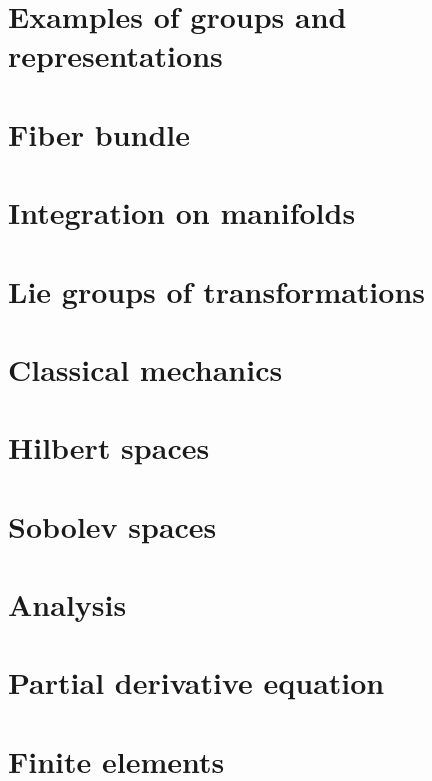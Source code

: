 \documentclass[a4paper,twoside,11pt]{book}
\begin{document}
\chapter{Examples of groups and representations}        \label{ChapThoComsGroupes}





\chapter{Fiber bundle}




\chapter{Integration on manifolds}



\chapter{Lie groups of transformations}


\chapter{Classical mechanics}


\chapter{Hilbert spaces}



\chapter{Sobolev spaces}


\chapter{Analysis}




\chapter{Partial derivative equation}


\chapter{Finite elements}

\end{document}
